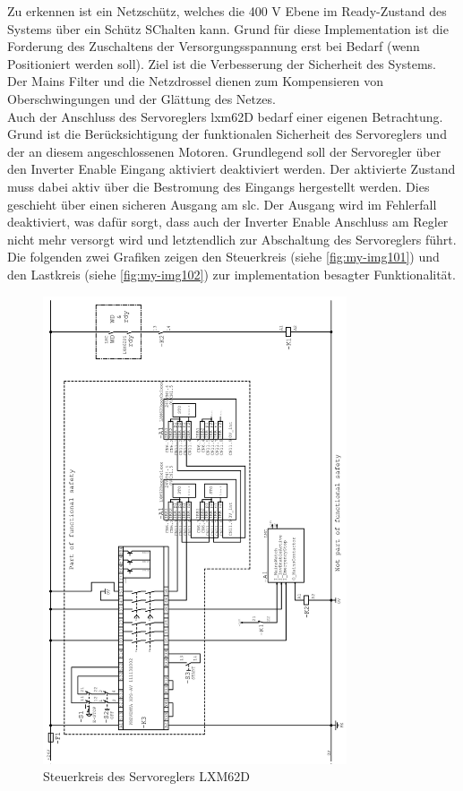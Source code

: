 \documentclass[../../../Bachelorarbeit.tex]{subfiles}
\begin{document}
Zu erkennen ist ein Netzschütz, welches die 400 \si{V} Ebene im Ready-Zustand des Systems über ein Schütz SChalten kann. Grund für diese Implementation ist die Forderung des Zuschaltens der Versorgungsspannung erst bei Bedarf (wenn Positioniert werden soll). Ziel ist die Verbesserung der Sicherheit des Systems. Der Mains Filter und die Netzdrossel dienen zum Kompensieren von Oberschwingungen und der Glättung des Netzes.\\
\smallskip \newline
Auch der Anschluss des Servoreglers \acs{lxm}62D bedarf einer eigenen Betrachtung. Grund ist die Berücksichtigung der funktionalen Sicherheit des Servoreglers und der an diesem angeschlossenen Motoren. Grundlegend soll der Servoregler über den Inverter Enable Eingang aktiviert \bzw deaktiviert werden. Der aktivierte Zustand muss dabei aktiv über die Bestromung des Eingangs hergestellt werden. Dies geschieht über einen sicheren Ausgang am \acs{slc}. Der Ausgang wird im Fehlerfall deaktiviert, was dafür sorgt, dass auch der Inverter Enable Anschluss am Regler nicht mehr versorgt wird und letztendlich zur Abschaltung des Servoreglers führt. Die folgenden zwei Grafiken zeigen den Steuerkreis (siehe \autoref{fig:my-img101}) und den Lastkreis (siehe \autoref{fig:my-img102}) zur implementation besagter Funktionalität.
\clearpage

\begin{figure}[H]
    \centering
    \includegraphics[width=0.8\textwidth]{Images/steuerkreis.jpg}
    \caption[Steuerkreis Servoregler]{Steuerkreis des Servoreglers LXM62D}
    \label{fig:my-img101}
\end{figure}
\end{document}
